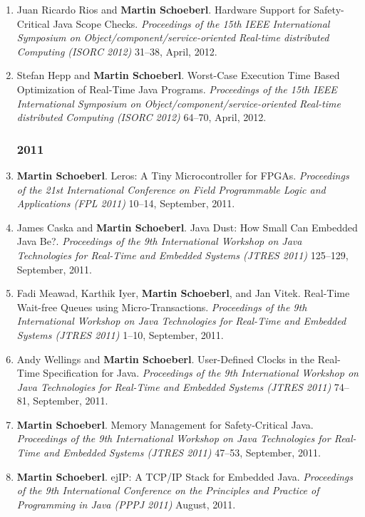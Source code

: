 \begin{enumerate}
\item Juan Ricardo Rios and {\bf Martin Schoeberl}.
 Hardware Support for Safety-Critical Java Scope Checks.
 \emph{Proceedings of the 15th IEEE International Symposium on Object/component/service-oriented Real-time distributed Computing (ISORC 2012)} 31--38, April, 2012.

\item Stefan Hepp and {\bf Martin Schoeberl}.
 Worst-Case Execution Time Based Optimization of Real-Time Java Programs.
 \emph{Proceedings of the 15th IEEE International Symposium on Object/component/service-oriented Real-time distributed Computing (ISORC 2012)} 64--70, April, 2012.


\subsubsection*{2011}

\item {\bf Martin Schoeberl}.
 Leros: A Tiny Microcontroller for FPGAs.
 \emph{Proceedings of the 21st International Conference on Field Programmable Logic and Applications (FPL 2011)} 10--14, September, 2011.

\item James Caska and {\bf Martin Schoeberl}.
 Java Dust: How Small Can Embedded Java Be?.
 \emph{Proceedings of the 9th International Workshop on Java Technologies for Real-Time and Embedded Systems (JTRES 2011)} 125--129, September, 2011.

\item Fadi Meawad, Karthik Iyer, {\bf Martin Schoeberl}, and Jan Vitek.
 Real-Time Wait-free Queues using Micro-Transactions.
 \emph{Proceedings of the 9th International Workshop on Java Technologies for Real-Time and Embedded Systems (JTRES 2011)} 1--10, September, 2011.

\item Andy Wellings and {\bf Martin Schoeberl}.
 User-Defined Clocks in the Real-Time Specification for Java.
 \emph{Proceedings of the 9th International Workshop on Java Technologies for Real-Time and Embedded Systems (JTRES 2011)} 74--81, September, 2011.

\item {\bf Martin Schoeberl}.
 Memory Management for Safety-Critical Java.
 \emph{Proceedings of the 9th International Workshop on Java Technologies for Real-Time and Embedded Systems (JTRES 2011)} 47--53, September, 2011.

\item {\bf Martin Schoeberl}.
 ejIP: A TCP/IP Stack for Embedded Java.
 \emph{Proceedings of the 9th International Conference on the Principles and Practice of Programming in Java (PPPJ 2011)} August, 2011.


\end{enumerate}
